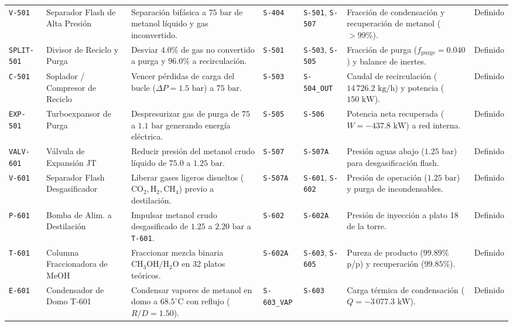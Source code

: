 \documentclass[10pt,letterpaper]{article}
\begin{document}
\begin{landscape}
\begin{xltabular}{\linewidth}{l >{\raggedright\arraybackslash}p{3.2cm} >{\raggedright\arraybackslash}X >{\centering\arraybackslash}p{2.0cm} >{\centering\arraybackslash}p{2.2cm} >{\raggedright\arraybackslash}p{4.5cm} c}
\texttt{V-501} & Separador Flash de Alta Presión & Separación bifásica a $75\text{ bar}$ de metanol líquido y gas inconvertido. & \texttt{S-404} & \texttt{S-501}, \texttt{S-507} & Fracción de condensación y recuperación de metanol ($>99\%$). & Definido \\
\texttt{SPLIT-501} & Divisor de Reciclo y Purga & Desviar $4.0\%$ de gas no convertido a purga y $96.0\%$ a recirculación. & \texttt{S-501} & \texttt{S-503}, \texttt{S-505} & Fracción de purga ($f_{\text{purge}} = 0.040$) y balance de inertes. & Definido \\
\texttt{C-501} & Soplador / Compresor de Reciclo & Vencer pérdidas de carga del bucle ($\Delta P = 1.5\text{ bar}$) a $75\text{ bar}$. & \texttt{S-503} & \texttt{S-504\_OUT} & Caudal de recirculación ($14\,726.2\text{ kg/h}$) y potencia ($150\text{ kW}$). & Definido \\
\texttt{EXP-501} & Turboexpansor de Purga & Despresurizar gas de purga de $75$ a $1.1\text{ bar}$ generando energía eléctrica. & \texttt{S-505} & \texttt{S-506} & Potencia neta recuperada ($W = -437.8\text{ kW}$) a red interna. & Definido \\
\texttt{VALV-601} & Válvula de Expansión JT & Reducir presión del metanol crudo líquido de $75.0$ a $1.25\text{ bar}$. & \texttt{S-507} & \texttt{S-507A} & Presión aguas abajo ($1.25\text{ bar}$) para desgasificación flash. & Definido \\
\texttt{V-601} & Separador Flash Desgasificador & Liberar gases ligeros disueltos ($\text{CO}_2, \text{H}_2, \text{CH}_4$) previo a destilación. & \texttt{S-507A} & \texttt{S-601}, \texttt{S-602} & Presión de operación ($1.25\text{ bar}$) y purga de incondensables. & Definido \\
\texttt{P-601} & Bomba de Alim. a Destilación & Impulsar metanol crudo desgasificado de $1.25$ a $2.20\text{ bar}$ a \texttt{T-601}. & \texttt{S-602} & \texttt{S-602A} & Presión de inyección a plato 18 de la torre. & Definido \\
\texttt{T-601} & Columna Fraccionadora de MeOH & Fraccionar mezcla binaria $\text{CH}_3\text{OH}/\text{H}_2\text{O}$ en 32 platos teóricos. & \texttt{S-602A} & \texttt{S-603}, \texttt{S-605} & Pureza de producto ($99.89\%$ p/p) y recuperación ($99.85\%$). & Definido \\
\texttt{E-601} & Condensador de Domo T-601 & Condensar vapores de metanol en domo a $68.5^\circ\text{C}$ con reflujo ($R/D=1.50$). & \texttt{S-603\_VAP} & \texttt{S-603} & Carga térmica de condensación ($Q=-3\,077.3\text{ kW}$). & Definido \\

\end{xltabular}
\end{landscape}
\end{document}
